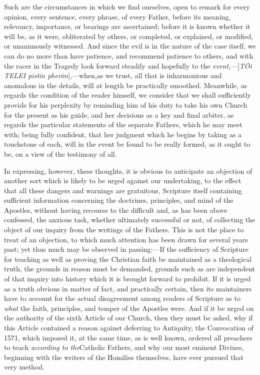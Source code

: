 Such are the circumstances in
which we find ourselves, open to remark for every opinion, every
sentence, every phrase, of every Father, before its meaning,
relevancy, importance, or bearings are ascertained; before it is known
whether it will be, as it were, obliterated by others, or completed,
or explained, or modified, or unanimously witnessed. And since the
evil is in the nature of the case itself, we can do no more than have
patience, and recommend patience to others, and with the racer in the
Tragedy look forward steadily and hopefully to the \emph{event},—[\emph{T\={O}i
TELEI pistin pher\={o}n}],—when,\emph{}as we trust, all that
is inharmonious and anomalous in the details, will at length be
practically smoothed. Meanwhile, as regards the condition of the
reader himself, we consider that we shall sufficiently provide for his
perplexity by reminding him of his duty to take his own Church for the
present as his guide, and her decisions as a key and final arbiter, as
regards the particular statements of the separate Fathers, which he
may meet with; being fully confident, that her judgment which he
begins by taking as a touchstone of each, will in the event be found
to be really formed, as it ought to be, on a view of the testimony of
all.

In expressing, however, these
thoughts, it is obvious to anticipate an objection of another sort
which is likely to be urged against our undertaking, to the effect
that all these dangers and warnings are gratuitous, Scripture itself
containing sufficient information concerning the doctrines,
principles, and mind of the Apostles, without having recourse to the
difficult and, as has been above confessed, the anxious task, whether
ultimately successful or not, of collecting the object of our inquiry
from the writings of the Fathers. This is not the place to treat of an
objection, to which much attention has been drawn for several years
past; yet thus much may be observed in passing:—If the sufficiency
of Scripture for teaching as well as proving the Christian faith be
maintained as a theological truth, the grounds in reason must be
demanded, grounds such as are independent of that inquiry into history
which it is brought forward to prohibit. If it is urged as a truth
obvious in matter of fact, and practically certain, then its
maintainers have to account for the actual disagreement among readers
of Scripture as to \emph{what} the faith, principles, and temper of
the Apostles were. And if it be urged on the authority of the sixth
Article of our Church, then they must be asked, why if this Article
contained a reason against deferring to Antiquity, the Convocation of
1571, which imposed it, at the same time, as is well known, ordered
all preachers to teach \emph{according to the}Catholic Fathers, and
why our most eminent Divines, beginning with the writers of the
Homilies themselves, have ever pursued that very method.

